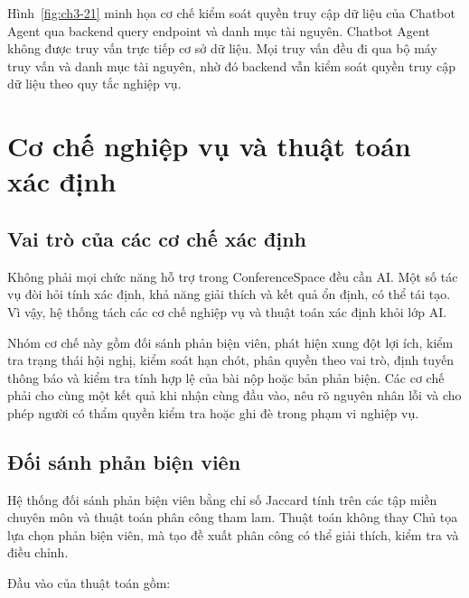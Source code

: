 Hình~\ref{fig:ch3-21} minh họa cơ chế kiểm soát quyền truy cập dữ liệu của Chatbot Agent qua backend query endpoint và danh mục tài nguyên. Chatbot Agent không được truy vấn trực tiếp cơ sở dữ liệu. Mọi truy vấn đều đi qua bộ máy truy vấn và danh mục tài nguyên, nhờ đó backend vẫn kiểm soát quyền truy cập dữ liệu theo quy tắc nghiệp vụ.

\section{Cơ chế nghiệp vụ và thuật toán xác định}

\subsection{Vai trò của các cơ chế xác định}

Không phải mọi chức năng hỗ trợ trong ConferenceSpace đều cần AI. Một số tác vụ đòi hỏi tính xác định, khả năng giải thích và kết quả ổn định, có thể tái tạo. Vì vậy, hệ thống tách các cơ chế nghiệp vụ và thuật toán xác định khỏi lớp AI.

Nhóm cơ chế này gồm đối sánh phản biện viên, phát hiện xung đột lợi ích, kiểm tra trạng thái hội nghị, kiểm soát hạn chót, phân quyền theo vai trò, định tuyến thông báo và kiểm tra tính hợp lệ của bài nộp hoặc bản phản biện. Các cơ chế phải cho cùng một kết quả khi nhận cùng đầu vào, nêu rõ nguyên nhân lỗi và cho phép người có thẩm quyền kiểm tra hoặc ghi đè trong phạm vi nghiệp vụ.

\subsection{Đối sánh phản biện viên}

Hệ thống đối sánh phản biện viên bằng chỉ số Jaccard tính trên các tập miền chuyên môn và thuật toán phân công tham lam. Thuật toán không thay Chủ tọa lựa chọn phản biện viên, mà tạo đề xuất phân công có thể giải thích, kiểm tra và điều chỉnh.

Đầu vào của thuật toán gồm:

